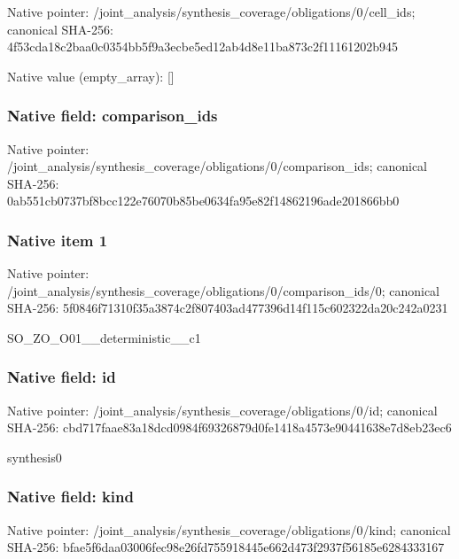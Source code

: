 \documentclass[10pt,a4paper]{article}
\begin{document}
Native pointer: /joint\_analysis/synthesi\allowbreak{}s\_coverage/obligations/0\allowbreak{}/cell\_ids; canonical SHA-256: 4f53cda18c2baa0c0354bb5f\allowbreak{}9a3ecbe5ed12ab4d8e11ba87\allowbreak{}3c2f11161202b945



Native value (empty\_array): []



\subsubsection{Native field: comparison\_ids}


Native pointer: /joint\_analysis/synthesi\allowbreak{}s\_coverage/obligations/0\allowbreak{}/comparison\_ids; canonical SHA-256: 0ab551cb0737bf8bcc122e76\allowbreak{}070b85be0634fa95e82f1486\allowbreak{}2196ade201866bb0



\subsubsection{Native item 1}


Native pointer: /joint\_analysis/synthesi\allowbreak{}s\_coverage/obligations/0\allowbreak{}/comparison\_ids/0; canonical SHA-256: 5f0846f71310f35a3874c2f8\allowbreak{}07403ad477396d14f115c602\allowbreak{}322da20c242a0231


SO\_ZO\_O01\_\_deterministic\_\_c1


\subsubsection{Native field: id}


Native pointer: /joint\_analysis/synthesi\allowbreak{}s\_coverage/obligations/0\allowbreak{}/id; canonical SHA-256: cbd717faae83a18dcd0984f6\allowbreak{}9326879d0fe1418a4573e904\allowbreak{}41638e7d8eb23ec6


synthesis0


\subsubsection{Native field: kind}


Native pointer: /joint\_analysis/synthesi\allowbreak{}s\_coverage/obligations/0\allowbreak{}/kind; canonical SHA-256: bfae5f6daa03006fec98e26f\allowbreak{}d755918445e662d473f2937f\allowbreak{}56185e6284333167
\end{document}
